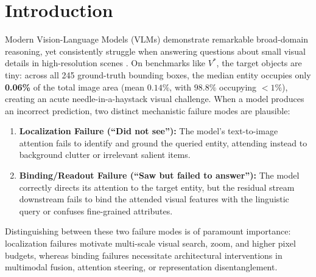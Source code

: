 \documentclass{article}
\begin{document}
\section{Introduction}

Modern Vision-Language Models (VLMs) demonstrate remarkable broad-domain reasoning, yet consistently struggle when answering questions about small visual details in high-resolution scenes \citep{wu2024vstar}. On benchmarks like $V^*$, the target objects are tiny: across all 245 ground-truth bounding boxes, the median entity occupies only \textbf{0.06\%} of the total image area (mean $0.14\%$, with $98.8\%$ occupying $<1\%$), creating an acute needle-in-a-haystack visual challenge. When a model produces an incorrect prediction, two distinct mechanistic failure modes are plausible:
\begin{enumerate}
    \item \textbf{Localization Failure (``Did not see''):} The model's text-to-image attention fails to identify and ground the queried entity, attending instead to background clutter or irrelevant salient items.
    \item \textbf{Binding/Readout Failure (``Saw but failed to answer''):} The model correctly directs its attention to the target entity, but the residual stream downstream fails to bind the attended visual features with the linguistic query or confuses fine-grained attributes.
\end{enumerate}

Distinguishing between these two failure modes is of paramount importance: localization failures motivate multi-scale visual search, zoom, and higher pixel budgets, whereas binding failures necessitate architectural interventions in multimodal fusion, attention steering, or representation disentanglement.
\end{document}

